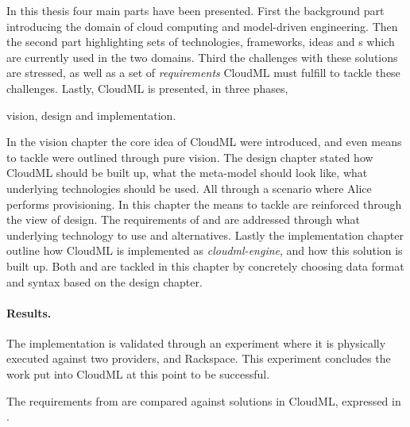 
In this thesis four main parts have been presented.
First the background part introducing the domain of cloud computing and model-driven engineering.
Then the second part highlighting sets of technologies, frameworks, ideas and 
s which are currently used in the two domains.
Third the challenges with these solutions are stressed, as well as a set of \emph{requirements}
CloudML must fulfill to tackle these challenges.
Lastly, CloudML is presented, in three phases,
\begin{ii}
  \iitem vision,
  \iitem design and
  \iitem implementation.
\end{ii}

In the vision chapter the core idea of CloudML were introduced,
and even means to tackle  were outlined through pure vision.
The design chapter stated how CloudML should be built up,
what the meta-model should look like,
what underlying technologies should be used.
All through a scenario where Alice performs provisioning.
In this chapter the means to tackle  are reinforced through
the view of design.
The requirements of  and 
are addressed through what underlying technology to use and alternatives.
Lastly the implementation chapter outline how CloudML is implemented
as \emph{cloudml-engine}, and how this solution is built up.
Both  and  are tackled in this chapter
by concretely choosing data format and syntax based on the design chapter.

\paragraph{Results.}


The implementation is validated through an experiment where
it is physically executed against two providers,  and Rackspace.
This experiment concludes the work put into CloudML at this point to be successful.

The requirements from  are compared against
solutions in CloudML, expressed in .

